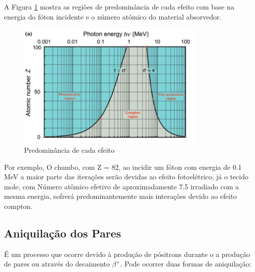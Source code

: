 \documentclass[11pt,a4paper]{article}
\newcounter{exemplo}
\begin{document}
            A Figura \ref{fig:predominanciaInteracoes} mostra as regiões de predominância de cada efeito com base na energia do fóton incidente e o número atômico do material absorvedor.    

            \begin{figure}[h]
                \centering
                \includegraphics[width=0.8\textwidth]{Imagens/predominanciaInteracoes.JPG}
                \caption{Predominância de cada efeito}
                \label{fig:predominanciaInteracoes}
            \end{figure}

            Por exemplo, O chumbo, com Z = 82, ao incidir um fóton com energia de 0.1 MeV a maior parte das iterações serão devidas ao efeito fotoelétrico, já o tecido mole, com Número atômico efetivo de aproximadamente 7.5 irradiado com a mesma energia, sofrerá predominantemente mais interações devido ao efeito compton.

        

        \subsection{Aniquilação dos Pares}

            É um processo que ocorre devido à produção de pósitrons durante o a produção de pares ou através do decaimento $\beta^+$. Pode ocorrer duas formas de aniquilação:
\end{document}
